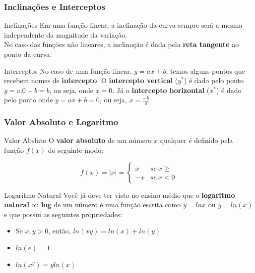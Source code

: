 \documentclass{beamer}[10]
\begin{document}
\begin{frame}
	\frametitle{Inclinações e Interceptos}
	
	\begin{block}{Inclinações}
		Em uma função linear, a inclinação da curva sempre será a mesma independente da magnitude da variação.\\
		No caso das funções não lineares, a inclinação é dada pela \textbf{reta tangente} ao ponto da curva.
	\end{block}

	\begin{block}{Interceptos}
		No caso de uma função linear, $ y = ax + b$, temos alguns pontos que recebem nomes de \textbf{intercepto}. O \textbf{intercepto vertical} ($y^*$) é dado pelo ponto $y = a.0 + b = b$, ou seja, onde $x = 0$. Já o \textbf{intercepto horizontal} ($x^*$) é dado pelo ponto onde $y = ax + b = 0 $, ou seja, $ x = \frac{-b}{a}$
	\end{block}
\end{frame}

\begin{frame}
	\frametitle{Valor Absoluto e Logaritmo}

	\begin{block}{Valor Absluto}
		O \textbf{valor absoluto} de um número $x$ qualquer é definido pela função $f(x)$ do seguinte modo:

		\[ f(x) = |x| = \begin{cases} x & se \ x \geqslant \\ -x & se \ x < 0 \end{cases} \]
	\end{block}

	\begin{block}{Logaritmo Natural}
		Você já deve ter visto no ensino médio que o \textbf{logaritmo natural} ou \textbf{log} de um número é uma função escrita como $y = lnx$ ou $y = ln(x)$ e que possui as seguintes propriedades:

		\begin{itemize}
			\item Se $x,y > 0$, então, $ ln(xy) = ln(x) + ln(y) $
			\item $ ln(e) = 1 $
			\item $ ln(x^y) = y ln(x) $
		\end{itemize}
	\end{block}
\end{frame}
\end{document}
